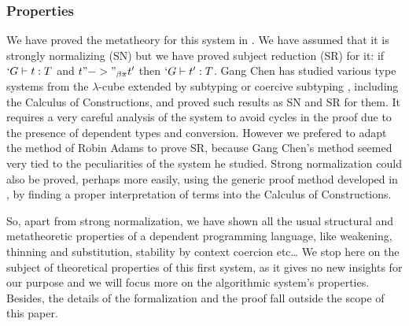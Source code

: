 \documentclass{llncs}
\begin{document}
\subsubsection{Properties}
We have proved the metatheory for this system in \Coq{}
\cite{sozeau:coq/Russell/meta}. We have assumed that it is strongly
normalizing (SN) but we have proved subject reduction (SR) for it: 
if $`G \vdash t : T$ and $t "->"_{\beta\pi} t'$ then $`G \vdash t' :
T$. Gang Chen \cite{ChenPhD} has studied various type systems from the
$\lambda$-cube extended by subtyping or coercive subtyping
\cite{DBLP:conf/csl/Luo96}, including the Calculus of Constructions, and
proved such results as SN and SR for them. It requires a very careful
analysis of the system to avoid cycles in the proof due to the presence
of dependent types and conversion. However we prefered to adapt the method of
Robin Adams \cite{adams:PTSEQ} to prove SR, because Gang Chen's method
seemed very tied to the peculiarities of the system he studied. 
Strong normalization could also be proved, perhaps more easily,
using the generic proof method developed in \cite{geuvers95}, by finding
a proper interpretation of \Russell terms into the Calculus of
Constructions.

So, apart from strong normalization, we have shown all the usual structural
and metatheoretic properties of a dependent programming language, like
weakening, thinning and substitution, stability by context coercion etc\ldots
We stop here on the subject of theoretical properties of this first system, as
it gives no new insights for our purpose and we will focus more on the
algorithmic system's properties. Besides, the details of the
formalization and the proof fall outside the scope of this paper.


\end{document}
